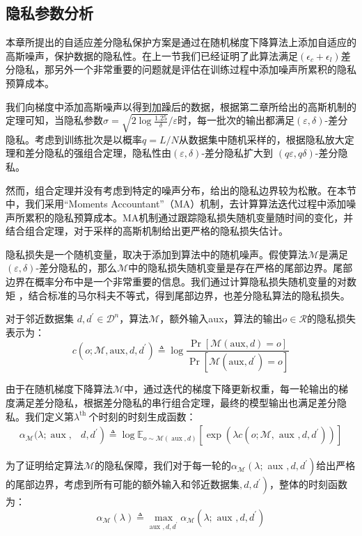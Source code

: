 \subsection{隐私参数分析}
本章所提出的自适应差分隐私保护方案是通过在随机梯度下降算法上添加自适应的高斯噪声，保护数据的隐私性。在上一节我们已经证明了此算法满足$\left(\epsilon_{c}+\epsilon_{l}\right)$差分隐私，那另外一个非常重要的问题就是评估在训练过程中添加噪声所累积的隐私预算成本。

我们向梯度中添加高斯噪声以得到加躁后的数据，根据第二章所给出的高斯机制的定理可知，当隐私参数$\sigma=\sqrt{2 \log \frac{1.25}{\delta}} / \varepsilon$时，每一批次的输出都满足$(\varepsilon, \delta)$-差分隐私。考虑到训练批次是以概率$q=L / N$从数据集中随机采样的，根据隐私放大定理和差分隐私的强组合定理，隐私性由$(\varepsilon, \delta)$-差分隐私扩大到 $(q \varepsilon, q \delta)$-差分隐私。

然而，组合定理并没有考虑到特定的噪声分布，给出的隐私边界较为松散。在本节中，我们采用“Moments Accountant”（MA）机制，去计算算法迭代过程中添加噪声所累积的隐私预算成本。MA机制通过跟踪隐私损失随机变量随时间的变化，并结合组合定理，对于采样的高斯机制给出更严格的隐私损失估计。

隐私损失是一个随机变量，取决于添加到算法中的随机噪声。假使算法$\mathcal{M}$是满足 $(\varepsilon, \delta)$-差分隐私的，那么$\mathcal{M}$中的隐私损失随机变量是存在严格的尾部边界。尾部边界在概率分布中是一个非常重要的信息。我们通过计算隐私损失随机变量的对数矩
，结合标准的马尔科夫不等式，得到尾部边界，也差分隐私算法的隐私损失。

对于邻近数据集 $d, d^{\prime} \in \mathcal{D}^{n}$，算法$\mathcal{M}$，额外输入aux，算法的输出$o \in \mathcal{R}$的隐私损失表示为：
$$
c\left(o ; \mathcal{M}, \mathrm{aux}, d, d^{\prime}\right) \triangleq \log \frac{\operatorname{Pr}[\mathcal{M}(\mathrm{aux}, d)=o]}{\operatorname{Pr}\left[\mathcal{M}\left(\mathrm{aux}, d^{\prime}\right)=o\right]}
$$

由于在随机梯度下降算法$\mathcal{M}$中，通过迭代的梯度下降更新权重，每一轮输出的梯度满足差分隐私，根据差分隐私的串行组合定理，最终的模型输出也满足差分隐私。我们定义第$\lambda^{\text {th }}$个时刻的时刻生成函数：
$$
\begin{aligned}
\alpha_{\mathcal{M}}(\lambda ; \operatorname{aux},&\left.d, d^{\prime}\right) \triangleq\log \mathbb{E}_{o \sim \mathcal{M}(\operatorname{aux}, d)}\left[\exp \left(\lambda c\left(o ; \mathcal{M}, \text { aux }, d, d^{\prime}\right)\right)\right]
\end{aligned}
$$

为了证明给定算法$\mathcal{M}$的隐私保障，我们对于每一轮的$\alpha_{\mathcal{M}}\left(\lambda ;\right.$ aux $\left., d, d^{\prime}\right)$给出严格的尾部边界，考虑到所有可能的额外输入和邻近数据集$\left., d, d^{\prime}\right)$，整体的时刻函数为：
$$
\alpha_{\mathcal{M}}(\lambda) \triangleq \max _{\text {aux }, d, d^{\prime}} \alpha_{\mathcal{M}}\left(\lambda ; \text { aux }, d, d^{\prime}\right)
$$


